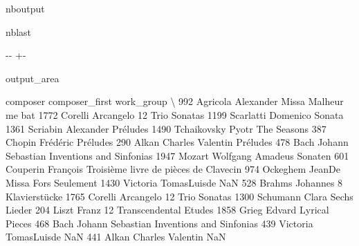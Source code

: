 \documentclass[letterpaper,10pt,english]{sphinxmanual}
\newlength\nbsphinxcodecellspacing
\begin{document}
\begin{sphinxuseclass}{nboutput}
\begin{sphinxuseclass}{nblast}
{

\kern-\sphinxverbatimsmallskipamount\kern-\baselineskip
\kern+\FrameHeightAdjust\kern-\fboxrule
\vspace{\nbsphinxcodecellspacing}

\begin{sphinxuseclass}{output_area}
\begin{sphinxuseclass}{}


\begin{sphinxVerbatim}[commandchars=\\\{\}]
\llap{\color{nbsphinxout}[26]:\,\hspace{\fboxrule}\hspace{\fboxsep}}         composer    composer\_first                             work\_group  \textbackslash{}
992      Agricola         Alexander                   Missa Malheur me bat
1772      Corelli         Arcangelo                        12 Trio Sonatas
1199    Scarlatti          Domenico                                 Sonata
1361     Scriabin         Alexander                               Préludes
1490  Tchaikovsky             Pyotr                            The Seasons
387        Chopin          Frédéric                               Préludes
290         Alkan  Charles Valentin                               Préludes
478          Bach  Johann Sebastian               Inventions and Sinfonias
1947       Mozart  Wolfgang Amadeus                                Sonaten
601      Couperin          François  Troisième livre de pièces de Clavecin
974      Ockeghem            JeanDe                   Missa Fors Seulement
1430     Victoria       TomasLuisde                                    NaN
528        Brahms          Johannes                        8 Klavierstücke
1765      Corelli         Arcangelo                        12 Trio Sonatas
1300     Schumann             Clara                           Sechs Lieder
204         Liszt             Franz               12 Transcendental Etudes
1858        Grieg            Edvard                         Lyrical Pieces
468          Bach  Johann Sebastian               Inventions and Sinfonias
439      Victoria       TomasLuisde                                    NaN
441         Alkan  Charles Valentin                                    NaN


\end{sphinxVerbatim}
\end{sphinxuseclass}
\end{sphinxuseclass}}
\end{sphinxuseclass}
\end{sphinxuseclass}
\end{document}
